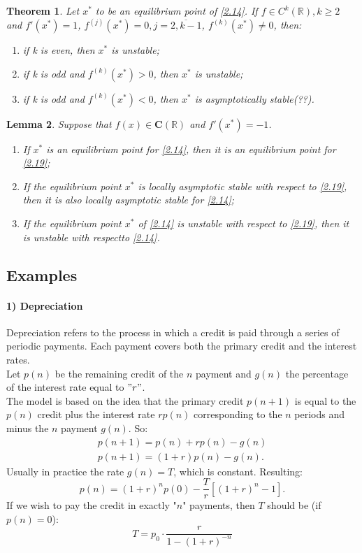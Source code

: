 \documentclass[a4paper,11pt]{report}
\newtheorem{theorem}{Theorem}[subsection]
\newtheorem{lemma}[theorem]{Lemma}
\newcommand{\R}{\mathbb{R}}
\newcommand{\xstar}{x^{*}}
\begin{document}
\begin{theorem}
 Let $\xstar$ to be an equilibrium point of \eqref{2.14}. If $f\in C^{k}(\R),k\geq 2$ and $f'(\xstar)=1$, $f^{(j)}(\xstar)=0, j=\overline{2,k-1}$, $f^{(k)}(\xstar)\neq 0$, then:
 \begin{enumerate}
  \item if k is even, then $\xstar$ is unstable;
  \item if k is odd and $f^{(k)}(\xstar)>0$, then $\xstar$ is unstable;
  \item if k is odd and $f^{(k)}(\xstar)<0$, then $\xstar$ is asymptotically stable(??).
 \end{enumerate}

\end{theorem}
\begin{lemma}
 Suppose that $f(x)\in \mathbf{C(\R)}$ and $f'(\xstar)=-1$. 
 \begin{enumerate}
  \item If $\xstar$ is an equilibrium point for \eqref{2.14}, then it is an equilibrium point for \eqref{2.19};
  \item If the equilibrium point $\xstar$ is locally asymptotic stable with respect to \eqref{2.19}, then it is also locally asymptotic stable for \eqref{2.14};
  \item If the equilibrium point $\xstar$ of \eqref{2.14} is unstable with respect to \eqref{2.19}, then it is unstable with respectto \eqref{2.14}.
 \end{enumerate}

\end{lemma}

\subsection{Examples}

\paragraph{1) Depreciation}

Depreciation refers to the process in which a credit is paid through a series of periodic payments. Each payment covers both the primary credit and the interest rates.\\
Let $p(n)$ be the remaining credit of the $n$ payment and $g(n)$ the percentage of the interest rate equal to $"r"$. \\
The model is based on the idea that the primary credit $p(n+1)$ is equal to the $p(n)$ credit plus the interest rate $rp(n)$ corresponding to the $n$ periods and minus the $n$ payment $g(n)$. So:
\begin{align*}
 p(n+1)=p(n)+rp(n)-g(n)\\
 p(n+1)=(1+r)p(n)-g(n).
\end{align*}
Usually in practice the rate $g(n)=T$, which is constant. Resulting:
\begin{equation}
 p(n)=(1+r)^{n}p(0)-\frac{T}{r}[(1+r)^{n}-1].
\end{equation}
If we wish to pay the credit in exactly "$n$" payments, then $T$ should be (if $p(n)=0$):
$$T=p_{0}\cdot\frac{r}{1-(1+r)^{-n}}$$ 
\end{document}
